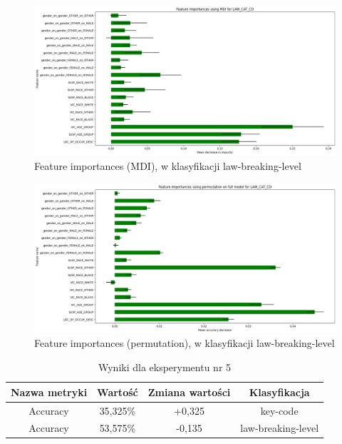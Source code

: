 \documentclass{classrep}
\begin{document}
{{{{                    \begin{figure}[!htbp]
                        \centering
                        \includegraphics[width=\textwidth]{img/5.1.3/5/Feature importances using MDI for LAW_CAT_CD.png}
                        \caption{Feature importances (MDI), w klasyfikacji law-breaking-level}
                        \label{goal_1_exp_5_imp_mdi_law}
                    \end{figure}
                    
                    \begin{figure}[!htbp]
                        \centering
                        \includegraphics[width=\textwidth]{img/5.1.3/5/Feature importances using permutation on full model for LAW_CAT_CD.png}
                        \caption{Feature importances (permutation), w klasyfikacji law-breaking-level}
                        \label{goal_1_exp_5_imp_perm_law}
                    \end{figure}
                    
                    \begin{table}
                    \centering
                     \begin{tabular}{|c|c|c|c|}
                            \hline
                          Nazwa metryki & Wartość & Zmiana wartości & Klasyfikacja \\ \hline
                            Accuracy &  35,325\% & +0,325 & key-code\\ \hline
                            Accuracy &  53,575\% & -0,135 & law-breaking-level\\ \hline
                        \end{tabular}
                        \caption{Wyniki dla eksperymentu nr 5}
                        \label{goal_1_exp_5_results}
                     \end{table}
                     \FloatBarrier
                }
            
}}}
\end{document}
